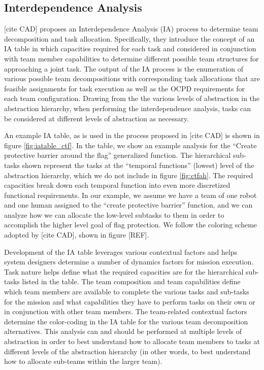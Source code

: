 \documentclass[letterpaper, 10 pt, conference]{ieeeconf}  %
\theoremstyle{definition}
\begin{document}
\subsection{Interdependence Analysis}
\label{sec:IA}
[cite CAD] proposes an Interdependence Analysis (IA) process to determine team decomposition and task allocation. Specifically, they introduce the concept of an IA table in which capacities required for each task and considered in conjunction with team member capabilities to determine different possible team structures for approaching a joint task. 
The output of the IA process is the enumeration of various possible team decompositions with corresponding task allocations that are feasible assignments for task execution as well as the OCPD requirements for each team configuration. Drawing from the the various levels of abstraction in the abstraction hierarchy, when performing the interdependence analysis, tasks can be considered at different levels of abstraction as necessary. 

An example IA table, as is used in the process proposed in [cite CAD] is shown in figure \ref{fig:iatable_ctf}. In the table, we show an example analysis for the ``Create protective barrier around the flag'' generalized function. The hierarchical sub-tasks shown represent the tasks at the ``temporal functions'' (lowest) level of the abstraction hierarchy, which we do not include in figure \ref{fig:ctfah}. The required capacities break down each temporal function into even more discretized functional requirements. In our example, we assume we have a team of one robot and one human assigned to the ``create protective barrier'' function, and we can analyze how we can allocate the low-level subtasks to them in order to accomplish the higher level goal of flag protection. We follow the coloring scheme adopted by [cite CAD], shown in figure [REF].

Development of the IA table leverages various contextual factors and helps system designers determine a number of dynamics factors for mission execution. Task nature helps define what the required capacities are for the hierarchical sub-tasks listed in the table. The team composition and team capabilities define which team members are available to complete the various tasks and sub-tasks for the mission and what capabilities they have to perform tasks on their own or in conjunction with other team members. The team-related contextual factors determine the color-coding in the IA table for the various team decomposition alternatives. This analysis can and should be performed at multiple levels of abstraction in order to best understand how to allocate team members to tasks at different levels of the abstraction hierarchy (in other words, to best understand how to allocate sub-teams within the larger team). 
\end{document}
